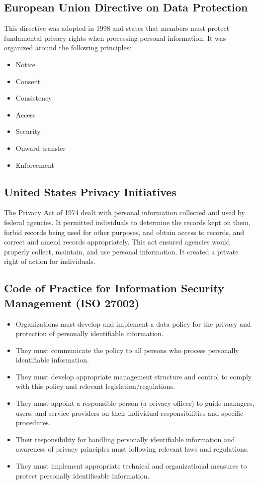 \documentclass{math}
\begin{document}
\subsection*{European Union Directive on Data Protection}
This directive was adopted in 1998 and states that members must protect
fundamental privacy rights when processing personal information. It was
organized around the following principles:
\begin{itemize}
  \item Notice
  \item Consent
  \item Consistency
  \item Access
  \item Security
  \item Onward transfer
  \item Enforcement
\end{itemize}

\subsection*{United States Privacy Initiatives}
The Privacy Act of 1974 dealt with personal information collected and used by
federal agencies. It permitted individuals to determine the records kept on
them, forbid records being used for other purposes, and obtain access to
records, and correct and amend records appropriately. This act ensured agencies
would properly collect, maintain, and use personal information. It created a
private right of action for individuals.

\subsection*{Code of Practice for Information Security Management (ISO 27002)}
\begin{itemize}
  \item Organizations must develop and implement a data policy for the privacy
  and protection of personally identifiable information.
  \item They must communicate the policy to all persons who process personally
  identifiable information.
  \item They must develop appropriate management structure and control to comply
  with this policy and relevant legislation/regulations.
  \item They must appoint a responsible person (a privacy officer) to guide
  managers, users, and service providers on their individual responsibilities
  and specific procedures.
  \item Their responsibility for handling personally identifiable information
  and awareness of privacy principles must following relevant laws and
  regulations.
  \item They must implement appropriate technical and organizational measures to
  protect personally identificable information.
\end{itemize}
\end{document}
